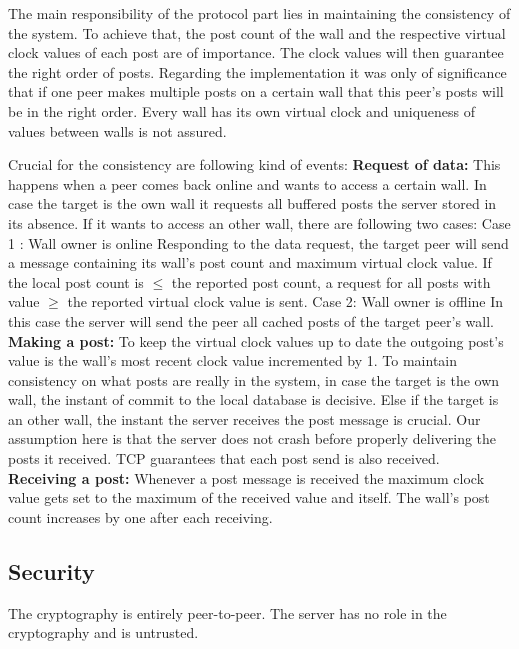 \documentclass{report}
\begin{document}

The main responsibility of the protocol part lies in maintaining the consistency of the system. To achieve that, the post count of the wall and the respective virtual clock values of each post are of importance. The clock values will then guarantee the right order of posts. Regarding the implementation it was only of significance that if one peer makes multiple posts on a certain wall that this peer's posts will be in the right order. Every wall has its own virtual clock and uniqueness of values between walls is not assured.

Crucial for the consistency are following kind of events:\newline
\textbf{Request of data:} This happens when a peer comes back online and wants to access a certain wall.  
In case the target is the own wall it requests all buffered posts the server stored in its absence.
If it wants to access an other wall, there are following two cases:\newline
Case 1 : Wall owner is online
Responding to the data request, the target peer will send a message containing its wall's post count and maximum virtual clock value. If the local post count is $\leq$ the reported post count, a request for all posts with value $\geq$ the reported virtual clock value is sent.\newline
Case 2: Wall owner is offline
In this case the server will send the peer all cached posts of the target peer's wall.\newline
\textbf{Making a post:}
To keep the virtual clock values up to date the outgoing post's value is the wall's most recent clock value incremented by 1.\newline
To maintain consistency on what posts are really in the system, in case the target is the own wall, the instant of commit to the local database is decisive.
Else if the target is an other wall, the instant the server receives the post message is crucial. Our assumption here is that the server does not crash before properly delivering the posts it received. TCP guarantees that each post send is also received.\newline
\textbf{Receiving a post:}
Whenever a post message is received the maximum clock value gets set to the maximum of the received value and itself.  The wall's post count increases by one after each receiving.

\subsection{Security}
The cryptography is entirely peer-to-peer. The server has no role in the cryptography and is untrusted.
\end{document}
